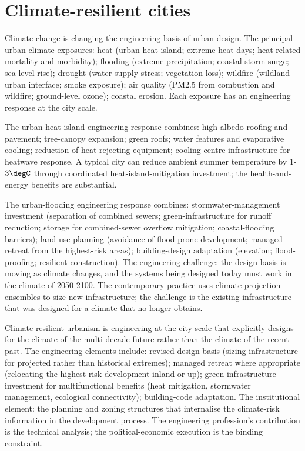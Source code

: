 \section{Climate-resilient cities}

Climate change is changing the engineering basis of urban design. The principal urban climate exposures: heat (urban heat island; extreme heat days; heat-related mortality and morbidity); flooding (extreme precipitation; coastal storm surge; sea-level rise); drought (water-supply stress; vegetation loss); wildfire (wildland-urban interface; smoke exposure); air quality (PM2.5 from combustion and wildfire; ground-level ozone); coastal erosion. Each exposure has an engineering response at the city scale.

The urban-heat-island engineering response combines: high-albedo roofing and pavement; tree-canopy expansion; green roofs; water features and evaporative cooling; reduction of heat-rejecting equipment; cooling-centre infrastructure for heatwave response. A typical city can reduce ambient summer temperature by $1$-$3\degC$ through coordinated heat-island-mitigation investment; the health-and-energy benefits are substantial.

The urban-flooding engineering response combines: stormwater-management investment (separation of combined sewers; green-infrastructure for runoff reduction; storage for combined-sewer overflow mitigation; coastal-flooding barriers); land-use planning (avoidance of flood-prone development; managed retreat from the highest-risk areas); building-design adaptation (elevation; flood-proofing; resilient construction). The engineering challenge: the design basis is moving as climate changes, and the systems being designed today must work in the climate of 2050-2100. The contemporary practice uses climate-projection ensembles to size new infrastructure; the challenge is the existing infrastructure that was designed for a climate that no longer obtains.

\begin{principle}
Climate-resilient urbanism is engineering at the city scale that explicitly designs for the climate of the multi-decade future rather than the climate of the recent past. The engineering elements include: revised design basis (sizing infrastructure for projected rather than historical extremes); managed retreat where appropriate (relocating the highest-risk development inland or up); green-infrastructure investment for multifunctional benefits (heat mitigation, stormwater management, ecological connectivity); building-code adaptation. The institutional element: the planning and zoning structures that internalise the climate-risk information in the development process. The engineering profession's contribution is the technical analysis; the political-economic execution is the binding constraint.
\end{principle}

